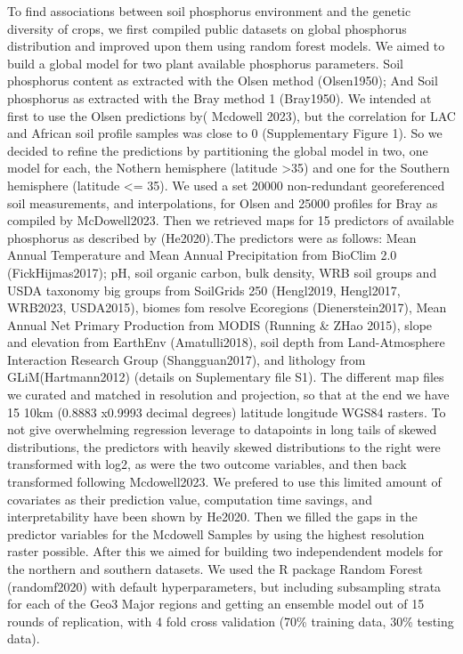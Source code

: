 To find associations between soil phosphorus environment and the genetic diversity of crops, we first compiled public datasets on global phosphorus distribution and improved upon them using random forest models.
We aimed to  build a global model for two plant available phosphorus parameters. Soil phosphorus content as extracted with the Olsen method (Olsen1950); And Soil phosphorus as extracted with the Bray method 1 (Bray1950).
We intended at first to use the Olsen predictions by( Mcdowell 2023), but the correlation for LAC and African soil profile samples was close to 0 (Supplementary Figure 1). So we decided to refine the predictions by partitioning the global model in two, one model for each, the Nothern hemisphere (latitude >35) and one for the Southern hemisphere (latitude <= 35).
We used a set 20000 non-redundant georeferenced soil measurements, and interpolations,  for Olsen and  25000 profiles for Bray as compiled by McDowell2023. 
Then we retrieved maps for 15 predictors of available phosphorus as described by (He2020).The predictors were as follows: Mean Annual Temperature and Mean Annual Precipitation from BioClim 2.0 (FickHijmas2017); pH, soil organic carbon, bulk density, WRB soil groups and  USDA taxonomy big groups from SoilGrids 250 (Hengl2019, Hengl2017, WRB2023, USDA2015), biomes fom resolve Ecoregions (Dienerstein2017), Mean Annual Net Primary Production from MODIS (Running \& ZHao 2015), slope and elevation from EarthEnv (Amatulli2018), soil depth  from Land-Atmosphere Interaction Research Group (Shangguan2017), and lithology from GLiM(Hartmann2012) (details on Suplementary file S1).
The different map files we curated and matched in resolution and projection, so that at the end we have 15 10km (0.8883 x0.9993 decimal degrees) latitude longitude WGS84 rasters. To not give  overwhelming regression leverage to datapoints in long tails of skewed distributions, the predictors with heavily skewed distributions to the right were transformed  with log2, as were the two outcome variables, and then back transformed following Mcdowell2023.
We prefered to use this limited amount of covariates as their prediction value, computation time savings, and interpretability have been shown by He2020. 
Then we filled the gaps in the predictor variables for the Mcdowell Samples by using the highest resolution raster possible.
After this we aimed for building two independendent models for the northern and southern datasets. We used the R package Random Forest (randomf2020) with default hyperparameters, but including subsampling strata  for each of the Geo3 Major regions and getting an ensemble model out of 15 rounds of replication, with 4 fold cross validation (70\% training data, 30\% testing data). 
